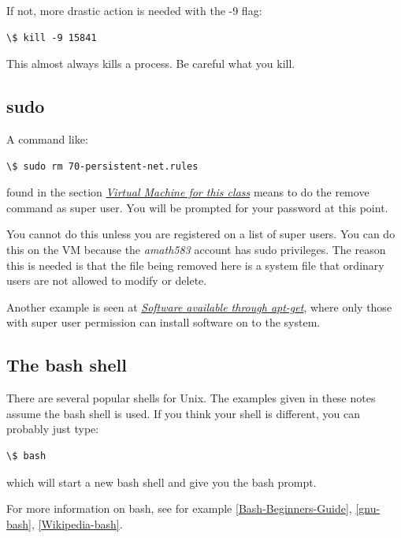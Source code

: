 \documentclass[letterpaper,10pt,english]{sphinxmanual}
\begin{document}
If not, more drastic action is needed with the -9 flag:

\begin{Verbatim}[commandchars=\\\{\}]
\$ kill -9 15841
\end{Verbatim}

This almost always kills a process.  Be careful what you kill.


\subsection{sudo}
\label{unix:sudo}\label{unix:id2}
A command like:

\begin{Verbatim}[commandchars=\\\{\}]
\$ sudo rm 70-persistent-net.rules
\end{Verbatim}

found in the section {\hyperref[vm:vm]{\emph{Virtual Machine for this class}}} means to do the remove command as super user.
You will be prompted for your password at this point.

You cannot do this unless you are registered on a list of super users. You
can do this on the VM because the \emph{amath583} account has sudo privileges. The
reason this is needed is that the file being removed here is a system file
that ordinary users are not allowed to modify or delete.

Another example is seen at {\hyperref[software_installation:apt-get]{\emph{Software available through apt-get}}}, where only those with super user
permission can install software on to the system.


\subsection{The bash shell}
\label{unix:bash}\label{unix:the-bash-shell}
There are several popular shells for Unix.  The examples given in these
notes assume the bash shell is used.  If you think your shell is different,
you can probably just type:

\begin{Verbatim}[commandchars=\\\{\}]
\$ bash
\end{Verbatim}

which will start a new bash shell and give you the bash prompt.

For more information on bash, see for example
{\hyperref[biblio:bash-beginners-guide]{{[}Bash-Beginners-Guide{]}}}, {\hyperref[biblio:gnu-bash]{{[}gnu-bash{]}}}, {\hyperref[biblio:wikipedia-bash]{{[}Wikipedia-bash{]}}}.
\end{document}
